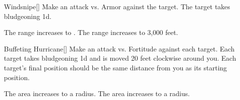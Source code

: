 \lowercase{\hypertarget{spell:Windsnipe}{}}\label{spell:Windsnipe}
\begin{freeability}[Rank 3]{\hypertarget{spell:Windsnipe}{Windsnipe}}[]
Make an attack vs. Armor against the target.
\hit The target takes bludgeoning  \plus1d.

\rankline
{} The range increases to \rngext.
 The range increases to 3,000 feet.
\end{freeability}
\vspace{0.25em}



\lowercase{\hypertarget{spell:Buffeting Hurricane}{}}\label{spell:Buffeting Hurricane}
\begin{freeability}[Rank 4]{\hypertarget{spell:Buffeting Hurricane}{Buffeting Hurricane}}[]
Make an attack vs. Fortitude against each target.
\hit Each target takes bludgeoning  \minus1d and is moved 20 feet clockwise around you.
Each target's final position should be the same distance from you as its starting position.

\rankline
{} The area increases to a \arealarge radius.
 The area increases to a \areahuge radius.
\end{freeability}
\vspace{0.25em}



